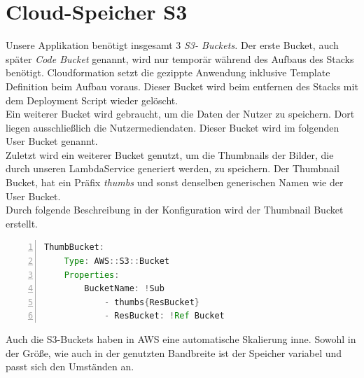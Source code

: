 \documentclass[a4paper, 12pt]{scrreprt}
\renewcommand\_{\textunderscore\allowbreak}
\begin{document}
\section{Cloud-Speicher S3}
Unsere Applikation benötigt insgesamt 3\textit{ S3- Buckets.} Der erste Bucket, auch später \textit{Code Bucket} genannt, wird nur temporär während des Aufbaus des Stacks benötigt. Cloudformation setzt die gezippte Anwendung inklusive Template Definition beim Aufbau voraus. Dieser Bucket wird beim entfernen des Stacks mit dem Deployment Script wieder gelöscht. \\
Ein weiterer Bucket wird gebraucht, um die Daten der Nutzer zu speichern. Dort liegen ausschließlich die Nutzermediendaten. Dieser Bucket wird im folgenden User Bucket genannt. \\
Zuletzt wird ein weiterer Bucket genutzt, um die Thumbnails der Bilder, die durch unseren LambdaService generiert werden, zu speichern. Der Thumbnail Bucket, hat ein Präfix \textit{thumbs} und sonst denselben generischen Namen wie der User Bucket. \\
Durch folgende Beschreibung in der Konfiguration wird der Thumbnail Bucket erstellt.
\begin{lstlisting}[xleftmargin=\parindent,numbers=left,numberstyle=\small,numbersep=8pt,frame=L,mathescape=true, basicstyle=\small, language=Java, lineskip={1.0pt}]
ThumbBucket:
    Type: AWS::S3::Bucket
    Properties:
        BucketName: !Sub
            - thumbs{ResBucket}
            - ResBucket: !Ref Bucket
\end{lstlisting}          
Auch die S3-Buckets haben in AWS eine automatische Skalierung inne. Sowohl in der Größe, wie auch in der genutzten Bandbreite ist der Speicher variabel und passt sich den Umständen an.
\end{document}
